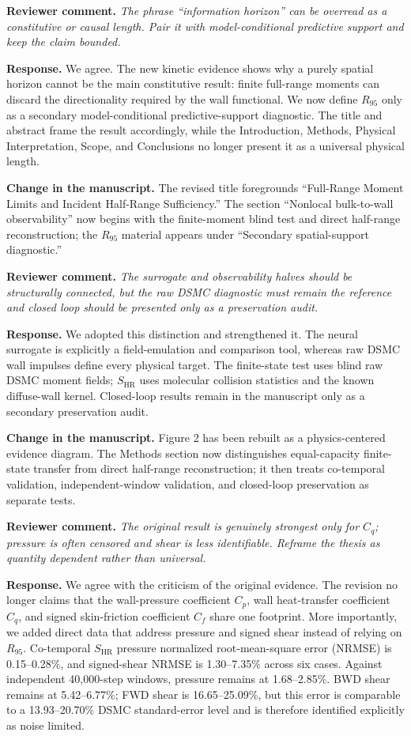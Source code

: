 \documentclass[11pt]{article}
\newcommand{\reviewer}[1]{\vspace{0.4em}\noindent\textbf{Reviewer comment.} \emph{#1}}
\newcommand{\response}{\noindent\textbf{Response.} }
\newcommand{\change}{\noindent\textbf{Change in the manuscript.} }
\begin{document}
\reviewer{The phrase ``information horizon'' can be overread as a constitutive or causal length. Pair it with model-conditional predictive support and keep the claim bounded.}

\response We agree. The new kinetic evidence shows why a purely spatial horizon cannot be the main constitutive result: finite full-range moments can discard the directionality required by the wall functional. We now define $R_{95}$ only as a secondary model-conditional predictive-support diagnostic. The title and abstract frame the result accordingly, while the Introduction, Methods, Physical Interpretation, Scope, and Conclusions no longer present it as a universal physical length.

\change The revised title foregrounds ``Full-Range Moment Limits and Incident Half-Range Sufficiency.'' The section ``Nonlocal bulk-to-wall observability'' now begins with the finite-moment blind test and direct half-range reconstruction; the $R_{95}$ material appears under ``Secondary spatial-support diagnostic.''

\reviewer{The surrogate and observability halves should be structurally connected, but the raw DSMC diagnostic must remain the reference and closed loop should be presented only as a preservation audit.}

\response We adopted this distinction and strengthened it. The neural surrogate is explicitly a field-emulation and comparison tool, whereas raw DSMC wall impulses define every physical target. The finite-state test uses blind raw DSMC moment fields; $S_{\mathrm{HR}}$ uses molecular collision statistics and the known diffuse-wall kernel. Closed-loop results remain in the manuscript only as a secondary preservation audit.

\change Figure 2 has been rebuilt as a physics-centered evidence diagram. The Methods section now distinguishes equal-capacity finite-state transfer from direct half-range reconstruction; it then treats co-temporal validation, independent-window validation, and closed-loop preservation as separate tests.

\reviewer{The original result is genuinely strongest only for $C_q$; pressure is often censored and shear is less identifiable. Reframe the thesis as quantity dependent rather than universal.}

\response We agree with the criticism of the original evidence. The revision no longer claims that the wall-pressure coefficient $C_p$, wall heat-transfer coefficient $C_q$, and signed skin-friction coefficient $C_f$ share one footprint. More importantly, we added direct data that address pressure and signed shear instead of relying on $R_{95}$. Co-temporal $S_{\mathrm{HR}}$ pressure normalized root-mean-square error (NRMSE) is 0.15--0.28\%, and signed-shear NRMSE is 1.30--7.35\% across six cases. Against independent 40,000-step windows, pressure remains at 1.68--2.85\%. BWD shear remains at 5.42--6.77\%; FWD shear is 16.65--25.09\%, but this error is comparable to a 13.93--20.70\% DSMC standard-error level and is therefore identified explicitly as noise limited.
\end{document}
